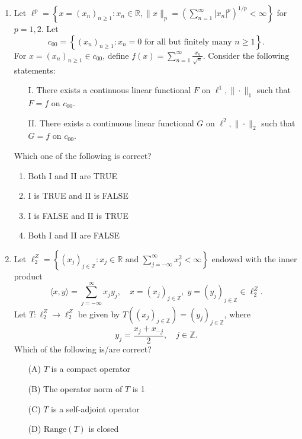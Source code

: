 \documentclass[journal]{IEEEtran}
\numberwithin{equation}{enumi}
\numberwithin{figure}{enumi}
\begin{document}
\begin{enumerate}
\item Let $\ell^p = \left\{ x = (x_n)_{n \geq 1} : x_n \in \mathbb{R}, \|x\|_p = \left( \sum_{n=1}^\infty |x_n|^p \right)^{1/p} < \infty \right\}$ for $p = 1, 2$. Let
\[
c_{00} = \left\{ (x_n)_{n \geq 1} : x_n = 0 \text{ for all but finitely many } n \geq 1 \right\}.
\]
For $x = (x_n)_{n \geq 1} \in c_{00}$, define $f(x) = \sum_{n=1}^\infty \frac{x_n}{\sqrt{n}}$. Consider the following statements:
\begin{enumerate}
    \item[I.] There exists a continuous linear functional $F$ on $\ell^1, \|\cdot\|_1$ such that $F = f$ on $c_{00}$.
    \item[II.] There exists a continuous linear functional $G$ on $\ell^2, \|\cdot\|_2$ such that $G = f$ on $c_{00}$.
\end{enumerate}
Which one of the following is correct?
\begin{enumerate}
    \item Both I and II are TRUE
    \item I is TRUE and II is FALSE
    \item I is FALSE and II is TRUE
    \item Both I and II are FALSE
\end{enumerate}
    \item Let $\ell_2^Z = \left\{ (x_j)_{j \in \mathbb{Z}} : x_j \in \mathbb{R} \text{ and } \sum_{j=-\infty}^{\infty} x_j^2 < \infty \right\}$ endowed with the inner product
    \[
    \langle x, y \rangle = \sum_{j=-\infty}^{\infty} x_j y_j, \quad x = (x_j)_{j \in \mathbb{Z}}, \; y = (y_j)_{j \in \mathbb{Z}} \in \ell_2^Z.
    \]
    Let $T : \ell_2^Z \rightarrow \ell_2^Z$ be given by $T((x_j)_{j \in \mathbb{Z}}) = (y_j)_{j \in \mathbb{Z}}$, where
    \[
    y_j = \frac{x_j + x_{-j}}{2}, \quad j \in \mathbb{Z}.
    \]
    Which of the following is/are correct?
    \begin{enumerate}
        \item[(A)] $T$ is a compact operator
        \item[(B)] The operator norm of $T$ is 1
        \item[(C)] $T$ is a self-adjoint operator
        \item[(D)] $\text{Range}(T)$ is closed
    \end{enumerate}

    \bigskip


\end{enumerate}
\end{document}
